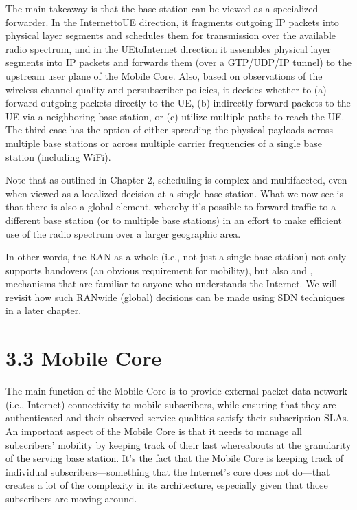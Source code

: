 \documentclass[a4paper,11pt,english]{sphinxmanual}
\begin{document}
\sphinxAtStartPar
The main takeaway is that the base station can be viewed as a
specialized forwarder. In the Internet\sphinxhyphen{}to\sphinxhyphen{}UE direction, it fragments
outgoing IP packets into physical layer segments and schedules them
for transmission over the available radio spectrum, and in the
UE\sphinxhyphen{}to\sphinxhyphen{}Internet direction it assembles physical layer segments into IP
packets and forwards them (over a GTP/UDP/IP tunnel) to the upstream
user plane of the Mobile Core. Also, based on observations of the
wireless channel quality and per\sphinxhyphen{}subscriber policies, it decides
whether to (a) forward outgoing packets directly to the UE, (b)
indirectly forward packets to the UE via a neighboring base station,
or (c) utilize multiple paths to reach the UE. The third case has the
option of either spreading the physical payloads across multiple base
stations or across multiple carrier frequencies of a single base
station (including Wi\sphinxhyphen{}Fi).

\sphinxAtStartPar
Note that as outlined in Chapter 2, scheduling is complex and
multi\sphinxhyphen{}faceted, even when viewed as a localized decision at a single
base station. What we now see is that there is also a global element,
whereby it’s possible to forward traffic to a different base station
(or to multiple base stations) in an effort to make efficient use of
the radio spectrum over a larger geographic area.

\sphinxAtStartPar
In other words, the RAN as a whole (i.e., not just a single base
station) not only supports handovers (an obvious requirement for
mobility), but also  and , mechanisms
that are familiar to anyone who understands the Internet. We will
revisit how such RAN\sphinxhyphen{}wide (global) decisions can be made using SDN
techniques in a later chapter.


\section{3.3 Mobile Core}
\label{\detokenize{arch:mobile-core}}
\sphinxAtStartPar
The main function of the Mobile Core is to provide external packet data
network (i.e., Internet) connectivity to mobile subscribers, while
ensuring that they are authenticated and their observed service
qualities satisfy their subscription SLAs. An important aspect of the
Mobile Core is that it needs to manage all subscribers’ mobility by
keeping track of their last whereabouts at the granularity of the
serving base station. It’s the fact that the Mobile Core is keeping
track of individual subscribers—something that the Internet’s core
does not do—that creates a lot of the complexity in its architecture,
especially given that those subscribers are moving around.
\end{document}
